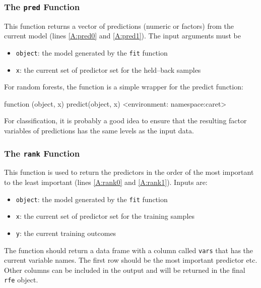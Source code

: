 \documentclass[12pt]{article}
\begin{document}
\subsubsection{The \texttt{pred} Function}

This function returns a vector of predictions (numeric or factors) from the current model (lines \ref{A:pred0} and \ref{A:pred1}). The input arguments must be
\begin{itemize}
\item \texttt{object}: the model generated by the \texttt{fit} function
\item \texttt{x}: the current set of predictor set for the held--back samples
\end{itemize}
For random forests, the function is a simple wrapper for the predict function:
\begin{Schunk}
\begin{Soutput}
function (object, x) 
{
    predict(object, x)
}
<environment: namespace:caret>
\end{Soutput}
\end{Schunk}
For classification, it is probably a good idea to ensure that the resulting factor variables of predictions has the same levels as the input data.

\subsubsection{The \texttt{rank} Function}

This function is used to return the predictors in the order of the most important to the least important (lines \ref{A:rank0} and \ref{A:rank1}). Inputs are:
\begin{itemize}
\item \texttt{object}: the model generated by the \texttt{fit} function
\item \texttt{x}: the current set of predictor set for the training samples
\item \texttt{y}: the current training outcomes
\end{itemize}
The function should return a data frame with a column called \texttt{vars} that has the current variable names. The first row should be the most important predictor etc. Other columns can be included in the output and will be returned in the final \texttt{rfe} object.
\end{document}
